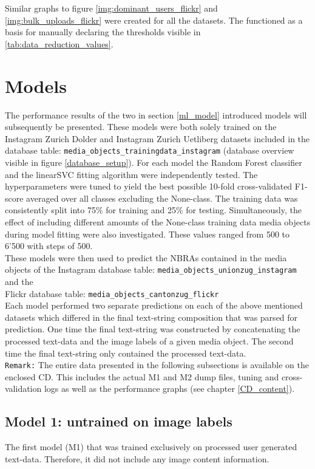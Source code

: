 Similar graphs to figure \ref{img:dominant_users_flickr} and \ref{img:bulk_uploads_flickr} were created for all the datasets. The functioned as a basis for manually declaring the thresholds visible in \ref{tab:data_reduction_values}. 

\section{Models} \label{results_models}
The performance results of the two in section \ref{ml_model} introduced models will subsequently be presented. These models were both solely trained on the Instagram Zurich Dolder and Instagram Zurich Uetliberg datasets included in the database table: \texttt{media\_objects\_trainingdata\_instagram} (database overview visible in figure \ref{database_setup}). For each model the Random Forest classifier and the linearSVC fitting algorithm were independently tested. The hyperparameters were tuned to yield the best possible 10-fold cross-validated F1-score averaged over all classes excluding the None-class. The training data was consistently split into 75\% for training and 25\% for testing. Simultaneously, the effect of including different amounts of the None-class training data media objects during model fitting were also investigated. These values ranged from 500 to 6'500 with steps of 500.\\
These models were then used to predict the NBRAs contained in the media objects of the Instagram database table: \texttt{media\_objects\_unionzug\_instagram} and the \\Flickr database table: \texttt{media\_objects\_cantonzug\_flickr}\\
Each model performed two separate predictions on each of the above mentioned datasets which differed in the final text-string composition that was parsed for prediction. One time the final text-string was constructed by concatenating the processed text-data and the image labels of a given media object. The second time the final text-string only contained the processed text-data.\\
\newline
\texttt{Remark:} The entire data presented in the following subsections is available on the enclosed CD. This includes the actual M1 and M2 dump files, tuning and cross-validation logs as well as the performance graphs (see chapter \ref{CD_content}).

\subsection{Model 1: untrained on image labels}
The first model (M1) that was trained exclusively on processed user generated text-data. Therefore, it did not include any image content information.

